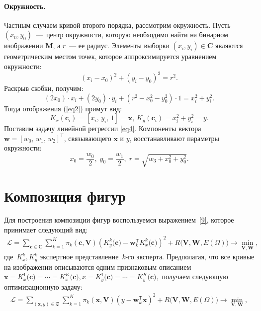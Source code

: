\documentclass[12pt, twoside]{article}
\numberwithin{equation}{section}
\begin{document}
\paragraph{Окружность.} Частным случаем кривой второго порядка, рассмотрим окружность.
Пусть $(x_0, y_0)$~---~центр окружности, которую необходимо найти на бинарном изображении $\mathbf{M}$, а $r$~--- ее радиус.
Элементы выборки $(x_i, y_i) \in \mathbf{C}$ являются геометрическим местом точек, которое аппроксимируется уравнением окружности:
\begin{equation}
(x_i - x_0)^2 + (y_i - y_0)^2 = r^2.
\end{equation}
Раскрыв скобки, получим:
\begin{equation}(2x_0)\cdot x_i + (2y_0)\cdot y_i + (r^2 - x_0^2 - y_0^2)\cdot 1 = x_i^2 + y_i^2 . 
\end{equation}
Тогда отображения (\ref{eq2}) примут вид:
\begin{equation}
\label{10}
K_{x}(\mathbf{c}_i) = [x_i, \, y_i, \, 1] = \mathbf{x}, \,  K_{y}(\mathbf{c}_i) = x_i^2+y_i^2 = y.
\end{equation} 
Поставим задачу линейной регрессии \eqref{eq4}.
Компоненты вектора $\mathbf{w} = [w_0, \, w_1, \, w_2]^\mathsf{T}$, связывающего $\mathbf{x}$ и $y$, восстанавливают параметры окружности: \begin{equation} x_0 = \frac{w_0}{2}, \; y_0 = \frac{w_1}{2}, \; r = \sqrt{w_3 + x_0^2 + y_0 ^2}.\end{equation}

\section{Композиция фигур}
Для построения композиции фигур воспользуемся выражением~\eqref{9}, которое принимает следующий вид:
\begin{equation} 
\label{statment:optim:task}
\begin{aligned}
\mathcal{L} = \sum\limits_{\mathbf{c} \in \mathbf{C}} \sum\limits_{k = 1}^{K} \pi_k(\mathbf{c}, \mathbf{V})\left(K^{k}_y\bigr(\mathbf{c}\bigr) - \mathbf{w}_k^{\mathsf{T}}K^{k}_x\bigr(\mathbf{c}\bigr)\right)^2 + R\bigl(\mathbf{V}, \mathbf{W}, E(\Omega)\bigr) \rightarrow \min_{\mathbf{V}, \mathbf{W}},
\end{aligned}
\end{equation} 
где~$K^{k}_x, K^{k}_y$ экспертное представление~$k$-го эксперта. Предполагая, что все кривые на изображении описываются одним признаковым описанием $\mathbf{x} = K^{1}_x\bigr(\mathbf{c}\bigr)=\cdots=K^{K}_x\bigr(\mathbf{c}\bigr), x= K^{1}_y\bigr(\mathbf{c}\bigr)=\cdots=K^{K}_y\bigr(\mathbf{c}\bigr),$ получаем следующую оптимизационную задачу:
\begin{equation} 
\label{statment:optim:task:simp}
\begin{aligned}
\mathcal{L} = \sum\limits_{\left(\mathbf{x}, y\right) \in \mathfrak{D}} \sum\limits_{k = 1}^{K} \pi_k(\mathbf{x}, \mathbf{V})\left(y - \mathbf{w}_k^{\mathsf{T}}\mathbf{x}\right)^2 + R\bigl(\mathbf{V}, \mathbf{W}, E(\Omega)\bigr) \rightarrow \min_{\mathbf{V}, \mathbf{W}},
\end{aligned}
\end{equation} 
\end{document}
